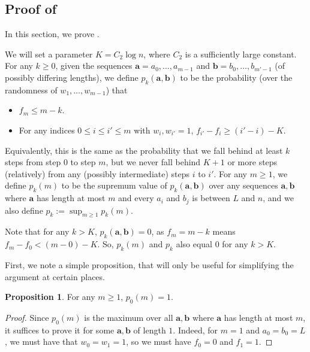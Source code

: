 \documentclass[12pt]{article}
\theoremstyle{definition}
\newtheorem{proposition}[theorem]{Proposition}
\theoremstyle{remark}
\newcommand{\ba}{\mathbf a}
\newcommand{\bb}{\mathbf b}
\begin{document}
\subsection{Proof of }\label{sec:main-technical}

In this section, we prove .

We will set a parameter $K = C_2 \log n$, where $C_2$ is a sufficiently large constant.
For any $k \ge 0$, given the sequences $\ba = a_0, \dots, a_{m-1}$ and $\bb = b_0, \dots, b_{m'-1}$ (of possibly differing lengths), we define $p_k(\ba, \bb)$ to be the probability (over the randomness of $w_1, \dots, w_{m-1}$) that
\begin{itemize}
    \item $f_m \le m-k$.
    \item For any indices $0 \le i \le i' \le m$ with $w_i, w_{i'} = 1$, $f_{i'}-f_i \ge (i'-i)-K$.
\end{itemize}
Equivalently, this is the same as the probability that we fall behind at least $k$ steps from step $0$ to step $m$, but we never fall behind $K+1$ or more steps (relatively) from any (possibly intermediate) steps $i$ to $i'$.
For any $m \ge 1$, we define $p_k(m)$ to be the supremum value of $p_k(\ba, \bb)$ over any sequences $\ba, \bb$ where $\ba$ has length at most $m$ and every $a_i$ and $b_j$ is between $L$ and $n$, and we also define $p_k := \sup_{m \ge 1} p_k(m)$.

Note that for any $k > K$, $p_k(\ba, \bb) = 0$, as $f_m 
= m-k$ means $f_m - f_0 < (m-0) - K$. So, $p_k(m)$ and $p_k$ also equal $0$ for any $k > K$.


First, we note a simple proposition, that will only be useful for simplifying the argument at certain places.

\begin{proposition} \label{prop:p0-equals-1}
    For any $m \ge 1$, $p_0(m) = 1$.
\end{proposition}

\begin{proof}
    Since $p_0(m)$ is the maximum over all $\ba, \bb$ where $\ba$ has length at most $m$, it suffices to prove it for some $\ba, \bb$ of length $1$. Indeed, for $m = 1$ and $a_0 = b_0 = L$, we must have that $w_0 = w_1 = 1$, so we must have $f_0 = 0$ and $f_1 = 1$.
\end{proof}
\end{document}

